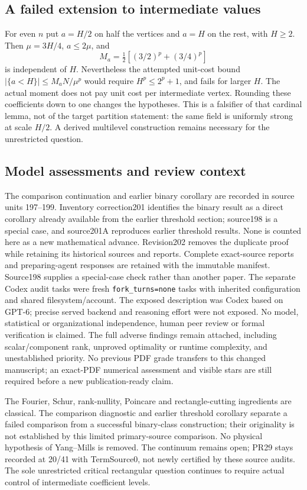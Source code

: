 \subsection{A failed extension to intermediate values}
For even $n$ put $a=H/2$ on half the vertices and $a=H$ on the rest, with
$H\ge2$. Then $\mu=3H/4$, $a\le2\mu$, and
\[
 M_a=\tfrac12[(3/2)^p+(3/4)^p]
\]
is independent of $H$. Nevertheless the attempted unit-cost bound
$|\{a<H\}|\le M_aN/\mu^p$ would require $H^p\le2^p+1$, and fails for
larger $H$. The actual moment does not pay unit cost per intermediate
vertex. Rounding these coefficients down to one changes the hypotheses.
This is a falsifier of that cardinal lemma, not of the target partition
statement: the same field is uniformly strong at scale $H/2$. A derived
multilevel construction remains necessary for the unrestricted question.

\subsection{Model assessments and review context}
The comparison continuation and earlier binary corollary are recorded in
source units 197--199. Inventory correction201 identifies the binary result
as a direct corollary already available from the earlier threshold section;
source198 is a special case, and source201A reproduces earlier threshold
results. None is counted here as a new mathematical advance. Revision202
removes the duplicate proof while retaining its historical sources and reports.
Complete exact-source reports and preparing-agent responses are retained
with the immutable manifest. Source198 supplies a special-case check rather
than another paper. The separate Codex audit tasks were fresh
\texttt{fork\_turns=none} tasks with inherited configuration and shared
filesystem/account. The exposed description was Codex based on GPT-6;
precise served backend and reasoning effort were not exposed. No model,
statistical or organizational independence, human peer review or formal
verification is claimed. The full adverse findings remain attached,
including scalar/component rank, unproved optimality or runtime complexity,
and unestablished priority. No previous PDF grade transfers to this changed
manuscript; an exact-PDF numerical assessment and visible stars are still
required before a new publication-ready claim.

The Fourier, Schur, rank-nullity, Poincare and rectangle-cutting ingredients
are classical. The comparison diagnostic and earlier threshold corollary separate a
failed comparison from a successful binary-class construction; their
originality is not established by this limited primary-source comparison.
No physical hypothesis of Yang--Mills is removed. The continuum remains
open; PR29 stays recorded at 20/41 with TermSource0, not newly certified by
these source audits. The sole unrestricted critical rectangular question
continues to require actual control of intermediate coefficient levels.
